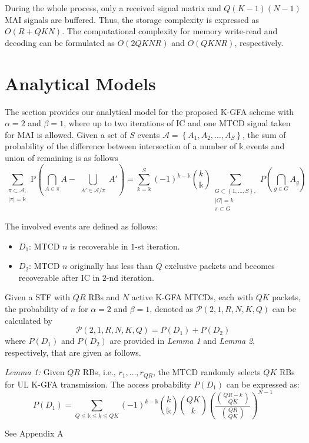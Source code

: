 \documentclass[a4paper]{IEEEtran}
\begin{document}
During the whole process, only a received signal matrix and $Q(K-1)(N-1)$ MAI signals are buffered. Thus, the storage complexity is expressed as $O(R+QKN)$. The computational complexity for memory write-read and decoding can be formulated as $O(2QKNR)$ and $O(QKNR)$, respectively.


\section{Analytical Models}
The section provides our analytical model for the proposed K-GFA scheme with $\alpha=2$ and $\beta=1$, where up to two iterations of IC and one MTCD signal taken for MAI is allowed. Given a set of $S$ events $\mathcal{A} = \left\{A_1, A_2, \dots, A_S \right\}$, the sum of probability of the difference between intersection of a number of $\mathbb{k}$ events and union of remaining is as follows
\begin{equation}
\sum\limits_{\substack{\pi \subset \mathcal{A}, \\ |\pi| = \mathbb{k}}} 
\text{P}(\bigcap\limits_{A \in \pi}A - \bigcup\limits_{\substack{A'\in \mathcal{A}/\pi}} A') = \sum^{S}_{k = \mathbb{k}}(-1)^{k-\mathbb{k}} {k \choose \mathbb{k}}
\sum\limits_{\substack{G \subset \left\{1, \dots, S\right\}, \\ |G| = k \\ \pi \subset G}} P(\bigcap_{g\in G} A_g)
\label{eq: set-difference}
\end{equation}

The involved events are defined as follows:
\begin{itemize}
\item $D_1$: MTCD $n$ is recoverable in $1$-st iteration.
\item $D_2$: MTCD $n$ originally has less than $Q$ exclusive packets and becomes recoverable after IC in $2$-nd iteration.
\end{itemize}

Given a STF with $QR$ RBs and $N$ active K-GFA MTCDs, each with $QK$ packets, the probability of $n$ for $\alpha=2$ and $\beta=1$, denoted as $\mathcal{P}(2, 1, R, N, K, Q)$ can be calculated by
\begin{equation}
\mathcal{P}(2, 1, R, N, K, Q) = P(D_1) + P(D_2)
\label{eq: analytical}
\end{equation}
where $P(D_1)$ and $P(D_2)$ are provided in \textit{Lemma 1} and \textit{Lemma 2}, respectively, that are given as follows.

\textit{Lemma 1:} Given $QR$ RBs, i.e., $r_1, \dots, r_{QR}$, the MTCD randomly selects $QK$ RBs for UL K-GFA transmission. The access probability $P(D_1)$ can be expressed as:
\begin{equation}
P(D_1) = \sum_{Q\leq \mathbb{k} \leq k \leq QK}(-1)^{k-\mathbb{k}} {k \choose \mathbb{k}} {QK \choose k} \left(\frac{{QR - k \choose QK}}{{QR \choose QK}} \right)^{N-1}
\label{eq: Lemma1}
\end{equation}
\begin{IEEEproof}
    See Appendix A
\end{IEEEproof}
\end{document}
